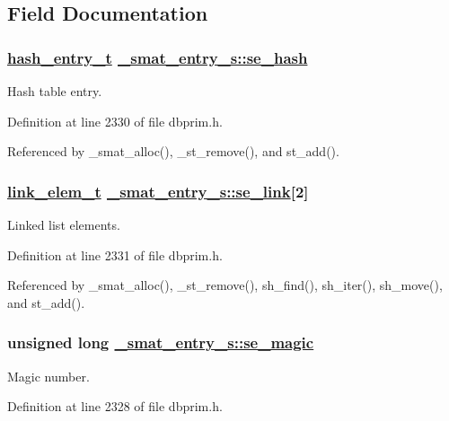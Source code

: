 \subsection{Field Documentation}
\hypertarget{struct__smat__entry__s_o2}{
\subsubsection[se\_\-hash]{\setlength{\rightskip}{0pt plus 5cm}\hyperlink{struct__hash__entry__s}{hash\_\-entry\_\-t} \hyperlink{struct__smat__entry__s_o2}{\_\-smat\_\-entry\_\-s::se\_\-hash}}}
\label{struct__smat__entry__s_o2}


Hash table entry. 

Definition at line 2330 of file dbprim.h.

Referenced by \_\-smat\_\-alloc(), \_\-st\_\-remove(), and st\_\-add().\hypertarget{struct__smat__entry__s_o3}{
\subsubsection[se\_\-link]{\setlength{\rightskip}{0pt plus 5cm}\hyperlink{struct__link__elem__s}{link\_\-elem\_\-t} \hyperlink{struct__smat__entry__s_o3}{\_\-smat\_\-entry\_\-s::se\_\-link}\mbox{[}2\mbox{]}}}
\label{struct__smat__entry__s_o3}


Linked list elements. 

Definition at line 2331 of file dbprim.h.

Referenced by \_\-smat\_\-alloc(), \_\-st\_\-remove(), sh\_\-find(), sh\_\-iter(), sh\_\-move(), and st\_\-add().\hypertarget{struct__smat__entry__s_o0}{
\subsubsection[se\_\-magic]{\setlength{\rightskip}{0pt plus 5cm}unsigned long \hyperlink{struct__smat__entry__s_o0}{\_\-smat\_\-entry\_\-s::se\_\-magic}}}
\label{struct__smat__entry__s_o0}


Magic number. 

Definition at line 2328 of file dbprim.h.

